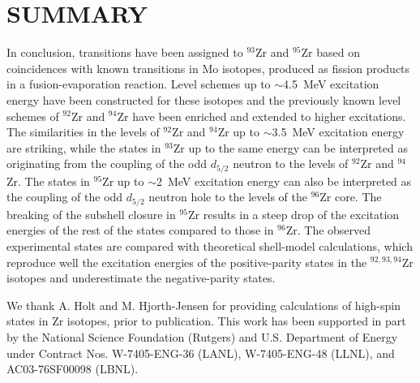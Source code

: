 \section{ SUMMARY}

 In conclusion, transitions have been assigned to $^{93}$Zr and $^{95}$Zr based on
coincidences with known transitions in Mo isotopes, produced as fission products
in a fusion-evaporation reaction. Level schemes up to $\sim$4.5~MeV excitation
energy have been constructed for these isotopes and the previously known level schemes
of $^{92}$Zr and $^{94}$Zr have been enriched and extended to higher excitations.
The similarities in the levels of $^{92}$Zr and $^{94}$Zr up to $\sim$3.5~MeV
excitation energy are striking, while the states in $^{93}$Zr up to the same
energy can be interpreted as originating from the coupling of the odd $d_{5/2}$
neutron to the levels of $^{92}$Zr and $^{94}$Zr. The states in $^{95}$Zr up
to $\sim$2~MeV excitation energy can also be interpreted as the coupling of
the odd $d_{5/2}$ neutron hole to the levels of the $^{96}$Zr core. 
The breaking of
the subshell closure in $^{95}$Zr results in a steep drop of the excitation 
energies of the rest of the states compared to those in $^{96}$Zr. The observed
experimental states are compared with theoretical 
shell-model calculations, which
reproduce well the excitation energies of the positive-parity states in the
$^{92,93,94}$Zr isotopes and underestimate the negative-parity states.

\acknowledgments

We thank A. Holt and M. Hjorth-Jensen for providing calculations 
of high-spin states in Zr isotopes, prior to publication.
This work has been supported in part by the 
National Science Foundation (Rutgers) and U.S. Department of Energy under
Contract Nos. W-7405-ENG-36 (LANL), W-7405-ENG-48 (LLNL), and AC03-76SF00098
(LBNL).

